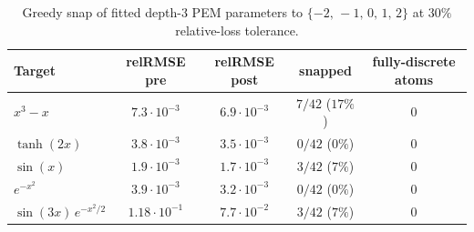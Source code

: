 \begin{table}[h]
  \centering
  \caption{Greedy snap of fitted depth-$3$ PEM parameters to
  $\{-2,\,-1,\,0,\,1,\,2\}$ at $30\%$ relative-loss tolerance.}
  \label{tab:pem_snap}
  \small
  \begin{tabular}{l|cccc}
    \toprule
    Target & relRMSE pre & relRMSE post & snapped & fully-discrete atoms \\
    \midrule
    $x^3 - x$              & $7.3\!\cdot\!10^{-3}$ & $6.9\!\cdot\!10^{-3}$ & $7/42$ ($17\%$) & $0$ \\
    $\tanh(2x)$            & $3.8\!\cdot\!10^{-3}$ & $3.5\!\cdot\!10^{-3}$ & $0/42$ ($0\%$)  & $0$ \\
    $\sin(x)$              & $1.9\!\cdot\!10^{-3}$ & $1.7\!\cdot\!10^{-3}$ & $3/42$ ($7\%$)  & $0$ \\
    $e^{-x^2}$             & $3.9\!\cdot\!10^{-3}$ & $3.2\!\cdot\!10^{-3}$ & $0/42$ ($0\%$)  & $0$ \\
    $\sin(3x)\,e^{-x^2/2}$ & $1.18\!\cdot\!10^{-1}$ & $7.7\!\cdot\!10^{-2}$ & $3/42$ ($7\%$)  & $0$ \\
    \bottomrule
  \end{tabular}
\end{table}

